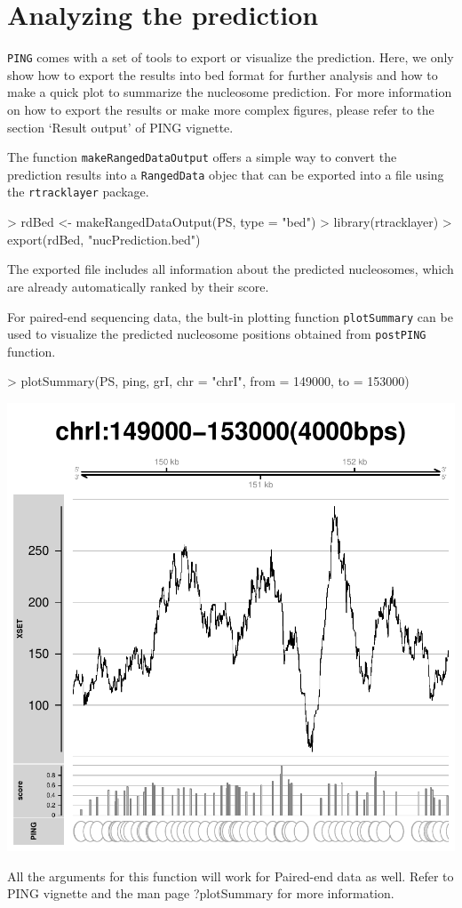 \documentclass[11pt]{article}
\begin{document}
\section{Analyzing the prediction}
\texttt{PING} comes with a set of tools to export or visualize the prediction.
Here, we only show how to export the results into bed format for further analysis and how to make a quick plot to summarize the nucleosome prediction. For more information on how to export the results or make more complex figures, please refer to the section `Result output' of PING vignette.

The function \texttt{makeRangedDataOutput} offers a simple way to convert the prediction results into a \texttt{RangedData} objec that can be exported into a file using the \texttt{rtracklayer} package. 

\begin{Schunk}
\begin{Sinput}
> rdBed <- makeRangedDataOutput(PS, type = "bed")
> library(rtracklayer)
> export(rdBed, "nucPrediction.bed")
\end{Sinput}
\end{Schunk}
The exported file includes all information about the predicted nucleosomes, which are already automatically ranked by their score. 

\vspace{10pt}
For paired-end sequencing data, the bult-in plotting function \texttt{plotSummary} can be used to visualize the predicted nucleosome positions obtained from \texttt{postPING} function. 


\begin{Schunk}
\begin{Sinput}
> plotSummary(PS, ping, grI, chr = "chrI", from = 149000, to = 153000)
\end{Sinput}
\end{Schunk}
\includegraphics{PING-PE-plotSummary-PE}

All the arguments for this function will work for Paired-end data as well. Refer to PING vignette and  the man page ?plotSummary for more information.
\end{document}

